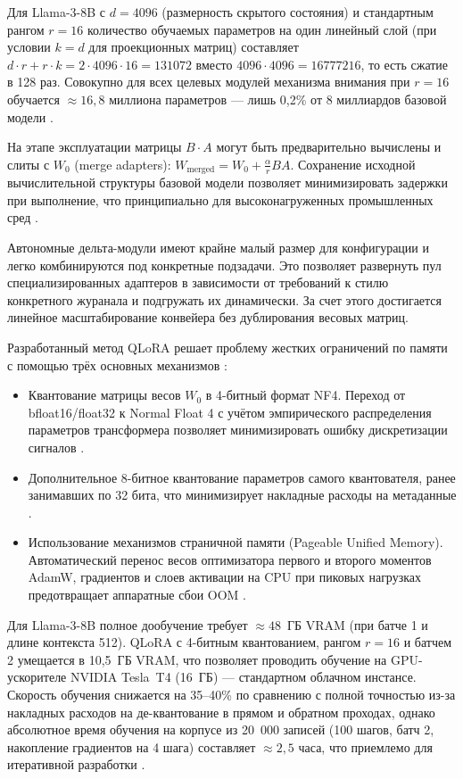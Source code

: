 Для Llama-3-8B с $d = 4096$ (размерность скрытого состояния) и стандартным рангом $r = 16$ количество обучаемых параметров на один линейный слой (при условии $k=d$ для проекционных матриц) составляет $d \cdot r + r \cdot k = 2 \cdot 4096 \cdot 16 = 131072$ вместо $4096 \cdot 4096 = 16777216$, то есть сжатие в 128 раз. Совокупно для всех целевых модулей механизма внимания при $r = 16$ обучается $\approx 16{,}8$ миллиона параметров --- лишь 0{,}2\% от 8 миллиардов базовой модели \cite{hu2022lora, liu2023parameter}.

На этапе эксплуатации матрицы $B \cdot A$ могут быть предварительно вычислены и слиты с $W_0$ (merge adapters): $W_{\text{merged}} = W_0 + \frac{\alpha}{r} B A$. Сохранение исходной вычислительной структуры базовой модели позволяет минимизировать задержки при выполнение, что принципиально для высоконагруженных промышленных сред \cite{hu2022lora}\cite{meng2023efficient}.

Автономные дельта-модули имеют крайне малый размер для конфигурации и легко комбинируются под конкретные подзадачи. Это позволяет развернуть пул специализированных адаптеров в зависимости от требований к стилю конкретного журанала и подгружать их динамически. За счет этого достигается линейное масштабирование конвейера без дублирования весовых матриц\cite{hu2022lora}\cite{wang2023lorahub}.

Разработанный метод QLoRA решает проблему жестких ограничений по памяти с помощью трёх основных механизмов \cite{dettmers2023qlora}:
\begin{itemize} 
    \item Квантование матрицы весов $W_0$ в 4-битный формат NF4. Переход от bfloat16/float32 к Normal Float 4 с учётом эмпирического распределения параметров трансформера позволяет минимизировать ошибку дискретизации сигналов \cite{dettmers2023qlora}.
    \item Дополнительное 8-битное квантование параметров самого квантователя, ранее занимавших по 32 бита, что минимизирует накладные расходы на метаданные \cite{dettmers2023qlora}.
    \item Использование механизмов страничной памяти (Pageable Unified Memory). Автоматический перенос весов оптимизатора первого и второго моментов AdamW, градиентов и слоев активации на CPU при пиковых нагрузках предотвращает аппаратные сбои OOM \cite{dettmers2023qlora, rajbhandari2019zero}. 
\end{itemize} 

Для Llama-3-8B полное дообучение требует $\approx 48$~ГБ VRAM (при батче 1 и длине контекста 512). QLoRA с 4-битным квантованием, рангом $r=16$ и батчем 2 умещается в 10{,}5~ГБ VRAM, что позволяет проводить обучение на GPU-ускорителе NVIDIA Tesla~T4 (16~ГБ) --- стандартном облачном инстансе. Скорость обучения снижается на 35--40\% по сравнению с полной точностью из-за накладных расходов на де-квантование в прямом и обратном проходах, однако абсолютное время обучения на корпусе из 20~000 записей (100 шагов, батч 2, накопление градиентов на 4 шага) составляет $\approx 2{,}5$ часа, что приемлемо для итеративной разработки \cite{dettmers2023qlora, liu2023parameter}.

